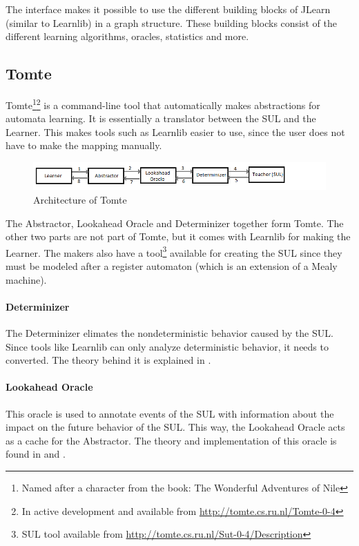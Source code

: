 The interface makes it possible to use the different building blocks of 
JLearn (similar to Learnlib) in a graph structure. These building blocks 
consist of the different learning algorithms, oracles, statistics and more. 


\subsection{Tomte}
\label{ssec:tomte}

Tomte\footnote{Named after a character from the book: The Wonderful Adventures 
of Nile}\footnote{In active development and available from
\url{http://tomte.cs.ru.nl/Tomte-0-4}} is a command-line tool that 
automatically makes abstractions for automata learning.  It is essentially a 
translator between the SUL and the Learner. This makes 
tools such as Learnlib easier to use, since the user does not have to make the 
mapping manually.

\begin{figure}[!h]
	\includegraphics[width=\textwidth]{Tool_images/tomte_network.png}
	\caption{Architecture of Tomte}
	\label{fig:tomte_arch_interaction}
\end{figure}

The Abstractor, Lookahead Oracle and Determinizer together form Tomte. The
other two parts are not part of Tomte, but it comes with Learnlib for making
the Learner. The makers also have a tool\footnote{SUL tool available from
\url{http://tomte.cs.ru.nl/Sut-0-4/Description}} available for creating the SUL
since they must be modeled after a register automaton\cite{Aarts2015}
(which is an extension of a Mealy machine).

\paragraph{Determinizer} The Determinizer elimates the nondeterministic
behavior caused by the SUL. Since tools like Learnlib can only analyze
deterministic behavior, it needs to converted. The theory behind it is
explained in \cite[p. 172]{Aarts2015}.

\paragraph{Lookahead Oracle} This oracle is used to annotate events of the SUL
with information about the impact on the future behavior of the SUL. This way,
the Lookahead Oracle acts as a cache for the Abstractor. The theory and
implementation of this oracle is found in \cite[p. 170]{Aarts2014} and
\cite[p. 105]{Tomte2014}.

